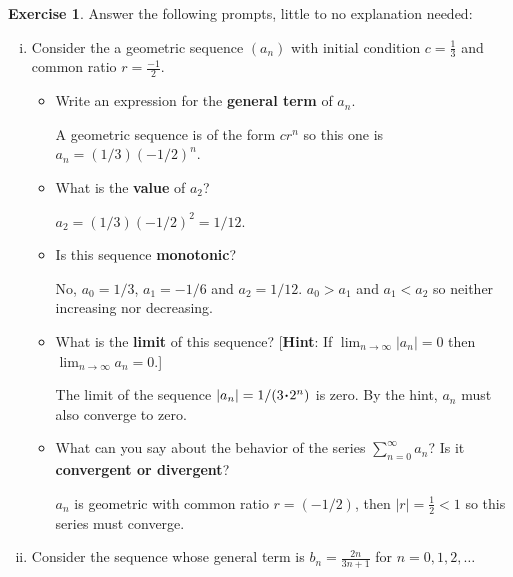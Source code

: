 \documentclass[12pt]{article}
\theoremstyle{plain}
\theoremstyle{definition}
\newtheorem{Ej}[Th]{Exercise}         %
\theoremstyle{remark}
\renewcommand{\:}{\colon}           %
\renewcommand{\.}{\Cdot}                %
\begin{document}

\begin{Ej}
Answer the following prompts, little to no explanation needed:
\vspace*{-0.8em}
\begin{enumerate}[i)]
  \item Consider the a geometric sequence $(a_n)$ with initial condition $c=\frac{1}{3}$ and common ratio $r=\frac{-1}{2}$. 
  \vspace*{-0.8em}
  \begin{itemize}
    \item Write an expression for the \textbf{general term} of $a_n$.
    \begin{ptcb}
    A geometric sequence is of the form $cr^n$ so this one is $a_n=(1/3)(-1/2)^n$.
    \end{ptcb}
    \item What is the \textbf{value} of $a_2$?
    \begin{ptcb}
      $a_2=(1/3)(-1/2)^2=1/12$.
      \end{ptcb}
    \item Is this sequence \textbf{monotonic}?
    \begin{ptcb}
      No, $a_0=1/3$, $a_1=-1/6$ and $a_2=1/12$.  $a_0>a_1$ and $a_1<a_2$ so neither increasing nor decreasing.
      \end{ptcb}
    \item What is the \textbf{limit }of this sequence? [\textbf{Hint}: If $\displaystyle\lim_{n\to\infty}|a_n|=0$ then $\displaystyle\lim_{n\to\infty}a_n =0$.]
    \begin{ptcb}
      The limit of the sequence $|a_n|=1/(3\.2^n)$ is zero. By the hint, $a_n$ must also converge to zero.
      \end{ptcb}
    \vspace*{-0.9em}
    \item What can you say about the behavior of the series $\displaystyle\sum_{n=0}^\infty a_n$? Is it \textbf{convergent or divergent}?
    \begin{ptcb}
      $a_n$ is geometric with common ratio $r=(-1/2)$, then $|r|=\frac{1}{2}<1$ so this series must converge.
      \end{ptcb}
  \end{itemize}
  \item Consider the sequence whose general term is $b_n=\frac{2n}{3n+1}$ for $n=0,1,2,\dots$
  \begin{itemize}

\end{itemize}
\end{enumerate}
\end{Ej}
\end{document}
